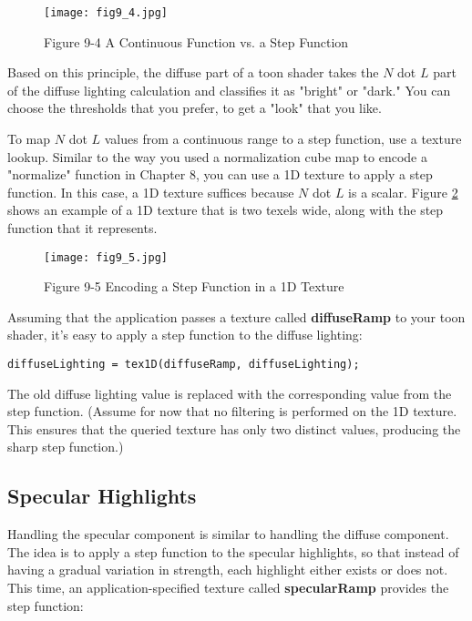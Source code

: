 \documentclass[../main.tex]{subfiles}
\begin{document}
\begin{figure}
    \centering
    \texttt{[image: fig9\_4.jpg]}
    \caption{Figure 9-4 A Continuous Function vs. a Step Function}
    \label{fig:9-4}
\end{figure}

Based on this principle, the diffuse part of a toon shader takes the $N$ dot $L$ part of the diffuse lighting calculation and classifies it as "bright" or "dark." You can choose the thresholds that you prefer, to get a "look" that you like.

To map $N$ dot $L$ values from a continuous range to a step function, use a texture lookup. Similar to the way you used a normalization cube map to encode a "normalize" function in Chapter 8, you can use a 1D texture to apply a step function. In this case, a 1D texture suffices because $N$ dot $L$ is a scalar. Figure \ref{fig:9-5} shows an example of a 1D texture that is two texels wide, along with the step function that it represents.

\begin{figure}
    \centering
    \texttt{[image: fig9\_5.jpg]}
    \caption{Figure 9-5 Encoding a Step Function in a 1D Texture}
    \label{fig:9-5}
\end{figure}

Assuming that the application passes a texture called \textbf{diffuseRamp} to your toon shader, it's easy to apply a step function to the diffuse lighting:

\FloatBarrier
\begin{lstlisting}
diffuseLighting = tex1D(diffuseRamp, diffuseLighting);
\end{lstlisting}
\FloatBarrier

The old diffuse lighting value is replaced with the corresponding value from the step function. (Assume for now that no filtering is performed on the 1D texture. This ensures that the queried texture has only two distinct values, producing the sharp step function.)

\subsection*{Specular Highlights}

Handling the specular component is similar to handling the diffuse component. The idea is to apply a step function to the specular highlights, so that instead of having a gradual variation in strength, each highlight either exists or does not. This time, an application-specified texture called \textbf{specularRamp} provides the step function:
\end{document}
